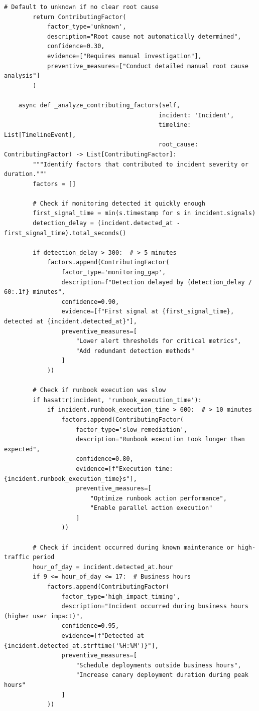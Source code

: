 \begin{lstlisting}[style=python, caption={Post-incident analysis with root cause identification}]
        # Default to unknown if no clear root cause
        return ContributingFactor(
            factor_type='unknown',
            description="Root cause not automatically determined",
            confidence=0.30,
            evidence=["Requires manual investigation"],
            preventive_measures=["Conduct detailed manual root cause analysis"]
        )

    async def _analyze_contributing_factors(self,
                                           incident: 'Incident',
                                           timeline: List[TimelineEvent],
                                           root_cause: ContributingFactor) -> List[ContributingFactor]:
        """Identify factors that contributed to incident severity or duration."""
        factors = []

        # Check if monitoring detected it quickly enough
        first_signal_time = min(s.timestamp for s in incident.signals)
        detection_delay = (incident.detected_at - first_signal_time).total_seconds()

        if detection_delay > 300:  # > 5 minutes
            factors.append(ContributingFactor(
                factor_type='monitoring_gap',
                description=f"Detection delayed by {detection_delay / 60:.1f} minutes",
                confidence=0.90,
                evidence=[f"First signal at {first_signal_time}, detected at {incident.detected_at}"],
                preventive_measures=[
                    "Lower alert thresholds for critical metrics",
                    "Add redundant detection methods"
                ]
            ))

        # Check if runbook execution was slow
        if hasattr(incident, 'runbook_execution_time'):
            if incident.runbook_execution_time > 600:  # > 10 minutes
                factors.append(ContributingFactor(
                    factor_type='slow_remediation',
                    description="Runbook execution took longer than expected",
                    confidence=0.80,
                    evidence=[f"Execution time: {incident.runbook_execution_time}s"],
                    preventive_measures=[
                        "Optimize runbook action performance",
                        "Enable parallel action execution"
                    ]
                ))

        # Check if incident occurred during known maintenance or high-traffic period
        hour_of_day = incident.detected_at.hour
        if 9 <= hour_of_day <= 17:  # Business hours
            factors.append(ContributingFactor(
                factor_type='high_impact_timing',
                description="Incident occurred during business hours (higher user impact)",
                confidence=0.95,
                evidence=[f"Detected at {incident.detected_at.strftime('%H:%M')}"],
                preventive_measures=[
                    "Schedule deployments outside business hours",
                    "Increase canary deployment duration during peak hours"
                ]
            ))


\end{lstlisting}
